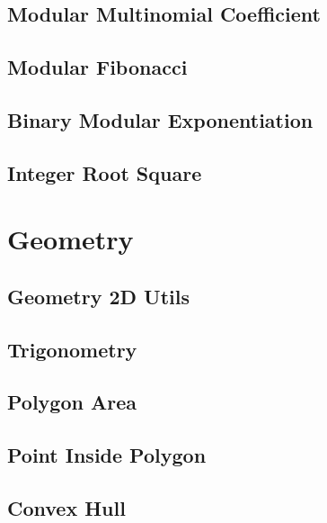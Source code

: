 \documentclass[10pt,landscape,twocolumn,a4paper,notitlepage]{article}
\begin{document}
  \subsection{Modular Multinomial Coefficient}
  

  \subsection{Modular Fibonacci}
  

  \subsection{Binary Modular Exponentiation}
  

  \subsection{Integer Root Square}
  

\section{Geometry}

  \subsection{Geometry 2D Utils}
  

  \subsection{Trigonometry}
  
  
  \subsection{Polygon Area}
  

  \subsection{Point Inside Polygon}
  

  \subsection{Convex Hull}
  
\end{document}
